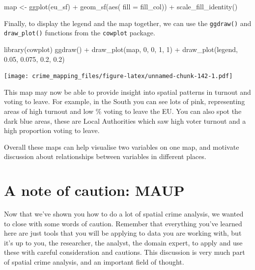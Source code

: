 \documentclass[
]{book}
\newenvironment{Shaded}{\begin{snugshade}}{\end{snugshade}}
\newcommand{\AttributeTok}[1]{\textcolor[rgb]{0.77,0.63,0.00}{#1}}
\newcommand{\DecValTok}[1]{\textcolor[rgb]{0.00,0.00,0.81}{#1}}
\newcommand{\FloatTok}[1]{\textcolor[rgb]{0.00,0.00,0.81}{#1}}
\newcommand{\FunctionTok}[1]{\textcolor[rgb]{0.00,0.00,0.00}{#1}}
\newcommand{\NormalTok}[1]{#1}
\newcommand{\OtherTok}[1]{\textcolor[rgb]{0.56,0.35,0.01}{#1}}
\newcommand{\SpecialCharTok}[1]{\textcolor[rgb]{0.00,0.00,0.00}{#1}}
\begin{document}
\begin{Shaded}
\begin{Highlighting}[]
\NormalTok{map }\OtherTok{\textless{}{-}} \FunctionTok{ggplot}\NormalTok{(eu\_sf) }\SpecialCharTok{+}
  \FunctionTok{geom\_sf}\NormalTok{(}\FunctionTok{aes}\NormalTok{( }\AttributeTok{fill =}\NormalTok{ fill\_col)) }\SpecialCharTok{+}
  \FunctionTok{scale\_fill\_identity}\NormalTok{() }
\end{Highlighting}
\end{Shaded}

Finally, to display the legend and the map together, we can use the \texttt{ggdraw()} and \texttt{draw\_plot()} functions from the \texttt{cowplot} package.

\begin{Shaded}
\begin{Highlighting}[]
\FunctionTok{library}\NormalTok{(cowplot)}
\FunctionTok{ggdraw}\NormalTok{() }\SpecialCharTok{+}
  \FunctionTok{draw\_plot}\NormalTok{(map, }\DecValTok{0}\NormalTok{, }\DecValTok{0}\NormalTok{, }\DecValTok{1}\NormalTok{, }\DecValTok{1}\NormalTok{) }\SpecialCharTok{+}
  \FunctionTok{draw\_plot}\NormalTok{(legend, }\FloatTok{0.05}\NormalTok{, }\FloatTok{0.075}\NormalTok{, }\FloatTok{0.2}\NormalTok{, }\FloatTok{0.2}\NormalTok{)}
\end{Highlighting}
\end{Shaded}

\texttt{[image: crime\_mapping\_files/figure-latex/unnamed-chunk-142-1.pdf]}

This map may now be able to provide insight into spatial patterns in turnout and voting to leave. For example, in the South you can see lots of pink, representing areas of high turnout and low \% voting to leave the EU. You can also spot the dark blue areas, these are Local Authorities which saw high voter turnout and a high proportion voting to leave.

Overall these maps can help visualise two variables on one map, and motivate discussion about relationships between variables in different places.

\hypertarget{a-note-of-caution-maup}{%
\section{A note of caution: MAUP}\label{a-note-of-caution-maup}}

Now that we've shown you how to do a lot of spatial crime analysis, we wanted to close with some words of caution. Remember that everything you've learned here are just tools that you will be applying to data you are working with, but it's up to you, the researcher, the analyst, the domain expert, to apply and use these with careful consideration and cautions. This discussion is very much part of spatial crime analysis, and an important field of thought.
\end{document}
